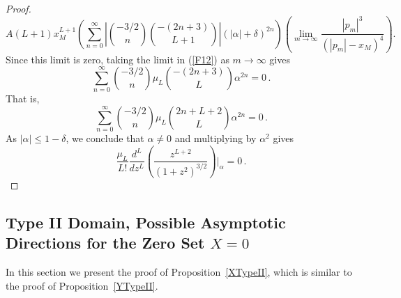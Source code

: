 \documentclass{article}
\theoremstyle{remark}
\numberwithin{equation}{section}
\begin{document}
\begin{proof}
$$A(L+1)x_M^{L+1} \left( \sum_{n=0}^\infty{ \left| \binom {-3/2}{n} \binom{-(2n+3)}{L+1} \right| \left( |\alpha| + \delta \right)^{2n}}  \right) 
\left( \lim_{m  \rightarrow \infty}{ \frac{|p_m|^3}{(|p_m|-x_M)^4}} \right).$$
Since this limit is zero, taking the limit in (\ref{F12}) as $m \rightarrow \infty$ gives
$$\sum_{n=0}^\infty{\binom{-3/2}{n} \mu_L \binom{-(2n+3)}{L} \alpha^{2n}} = 0\,.$$
That is, 
$$\sum_{n=0}^\infty{\binom{-3/2}{n} \mu_L \binom{2n+L+2}{L} \alpha^{2n}} = 0\,.$$
As $|\alpha| \leq 1-\delta$, we conclude that $\alpha \neq 0$ and multiplying by $\alpha^2$ gives
$$\frac{\mu_L}{L!} \frac{d^L}{dz^L} \left( \frac{z^{L+2}}{(1+z^2)^{3/2}} \right)\bigg |_\alpha = 0\,.$$
\end{proof}

\subsection{Type II Domain, Possible Asymptotic Directions for the Zero Set $X=0$}\label{SecXTypeII}

In this section we present the proof of Proposition~\ref{XTypeII}, which is similar to the proof of Proposition~\ref{YTypeII}.
\end{document}
